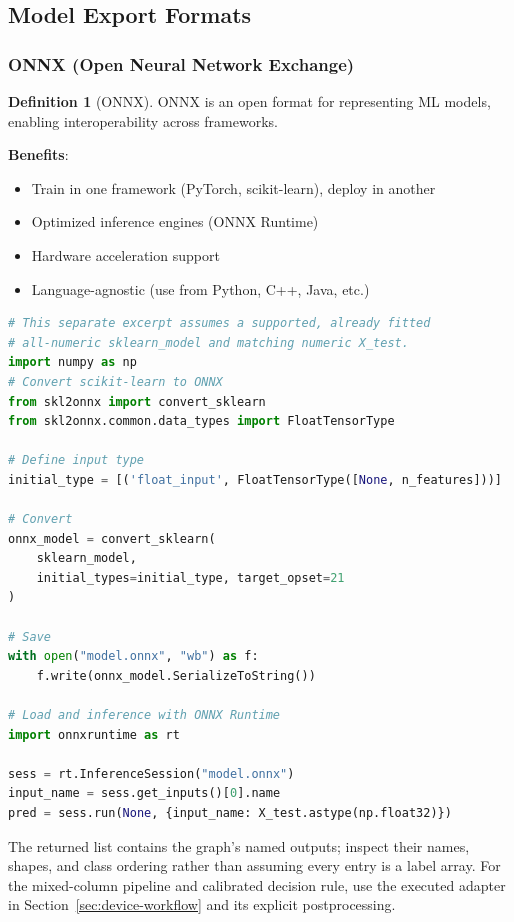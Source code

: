 \documentclass[11pt,twoside]{article}
\numberwithin{equation}{section}
\theoremstyle{plain}
\theoremstyle{definition}
\newtheorem{definition}[theorem]{Definition}
\theoremstyle{remark}
\begin{document}
\subsection{Model Export Formats}

\subsubsection{ONNX (Open Neural Network Exchange)}

\begin{definition}[ONNX]
ONNX is an open format for representing ML models, enabling interoperability across frameworks.

\textbf{Benefits}:
\begin{itemize}
\item Train in one framework (PyTorch, scikit-learn), deploy in another
\item Optimized inference engines (ONNX Runtime)
\item Hardware acceleration support
\item Language-agnostic (use from Python, C++, Java, etc.)
\end{itemize}

\begin{lstlisting}[language=Python]
# This separate excerpt assumes a supported, already fitted
# all-numeric sklearn_model and matching numeric X_test.
import numpy as np
# Convert scikit-learn to ONNX
from skl2onnx import convert_sklearn
from skl2onnx.common.data_types import FloatTensorType

# Define input type
initial_type = [('float_input', FloatTensorType([None, n_features]))]

# Convert
onnx_model = convert_sklearn(
    sklearn_model, 
    initial_types=initial_type, target_opset=21
)

# Save
with open("model.onnx", "wb") as f:
    f.write(onnx_model.SerializeToString())

# Load and inference with ONNX Runtime
import onnxruntime as rt

sess = rt.InferenceSession("model.onnx")
input_name = sess.get_inputs()[0].name
pred = sess.run(None, {input_name: X_test.astype(np.float32)})
\end{lstlisting}
The returned list contains the graph's named outputs; inspect their names,
shapes, and class ordering rather than assuming every entry is a label array.
For the mixed-column pipeline and calibrated decision rule, use the executed
adapter in Section~\ref{sec:device-workflow} and its explicit postprocessing.

\end{definition}
\end{document}
